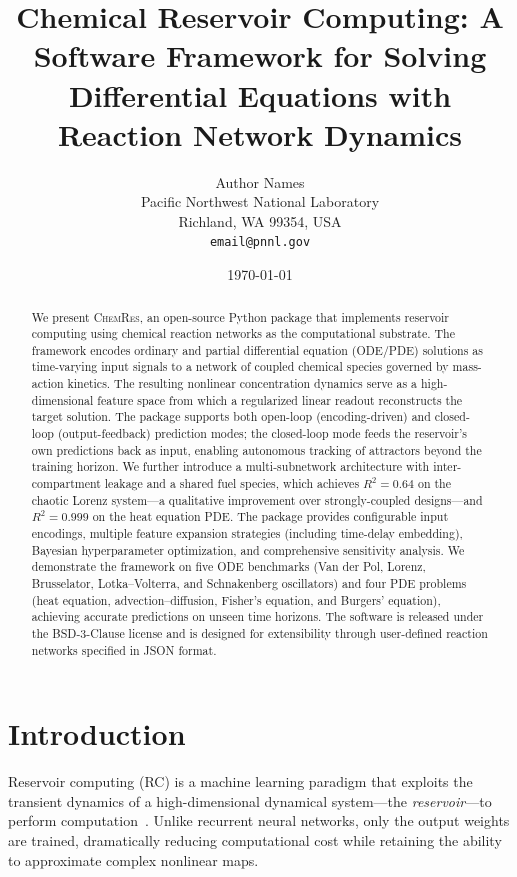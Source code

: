 \documentclass[11pt,twocolumn]{article}
\title{Chemical Reservoir Computing: A Software Framework for Solving\\
Differential Equations with Reaction Network Dynamics}
\author{%
  Author Names\\
  Pacific Northwest National Laboratory\\
  Richland, WA 99354, USA\\
  \texttt{email@pnnl.gov}
}
\date{\today}
\newcommand{\software}{\textsc{ChemRes}}
\begin{document}
\maketitle

\begin{abstract}
We present \software{}, an open-source Python package that implements reservoir
computing using chemical reaction networks as the computational substrate.  The
framework encodes ordinary and partial differential equation (ODE/PDE) solutions
as time-varying input signals to a network of coupled chemical species governed
by mass-action kinetics.  The resulting nonlinear concentration dynamics serve
as a high-dimensional feature space from which a regularized linear readout
reconstructs the target solution.  The package supports both open-loop
(encoding-driven) and closed-loop (output-feedback) prediction modes;
the closed-loop mode feeds the reservoir's own predictions back as input,
enabling autonomous tracking of attractors beyond the training horizon.
We further introduce a multi-subnetwork architecture with inter-compartment
leakage and a shared fuel species, which achieves $R^2 = 0.64$ on the chaotic
Lorenz system---a qualitative improvement over strongly-coupled designs---and
$R^2 = 0.999$ on the heat equation PDE.
The package provides configurable input
encodings, multiple feature expansion strategies (including time-delay
embedding), Bayesian hyperparameter optimization, and comprehensive sensitivity
analysis.  We demonstrate the framework on five ODE benchmarks (Van der Pol,
Lorenz, Brusselator, Lotka--Volterra, and Schnakenberg oscillators) and four
PDE problems (heat equation, advection--diffusion, Fisher's equation, and
Burgers' equation), achieving accurate predictions on unseen time horizons.
The software is released under the BSD-3-Clause license and is designed for
extensibility through user-defined reaction networks specified in JSON format.
\end{abstract}

\section{Introduction}
\label{sec:intro}

Reservoir computing (RC) is a machine learning paradigm that exploits the
transient dynamics of a high-dimensional dynamical system---the
\emph{reservoir}---to perform computation~\cite{jaeger2001echo,
maass2002real}.  Unlike recurrent neural networks, only the output weights are
trained, dramatically reducing computational cost while retaining the ability
to approximate complex nonlinear maps.
\end{document}
